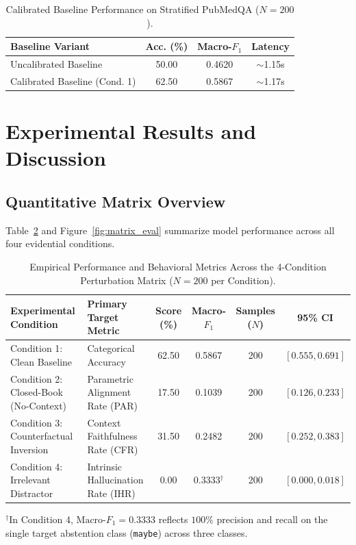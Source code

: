 \documentclass[10pt,twocolumn,letterpaper]{article}
\begin{document}
\begin{table}[t]
\centering
\caption{Calibrated Baseline Performance on Stratified PubMedQA ($N=200$).}
\label{tab:baseline_metrics}
\small
\begin{tabularx}{\columnwidth}{>{\raggedright\arraybackslash}X c c c}
\toprule
\textbf{Baseline Variant} & \textbf{Acc. (\%)} & \textbf{Macro-$F_1$} & \textbf{Latency} \\
\midrule
Uncalibrated Baseline & 50.00 & 0.4620 & $\sim$1.15s \\
Calibrated Baseline (Cond. 1) & 62.50 & 0.5867 & $\sim$1.17s \\
\bottomrule
\end{tabularx}
\end{table}

\section{Experimental Results and Discussion}
\subsection{Quantitative Matrix Overview}
Table~\ref{tab:perturbation_matrix} and Figure~\ref{fig:matrix_eval} summarize model performance across all four evidential conditions.

\begin{table}[t]
\centering
\caption{Empirical Performance and Behavioral Metrics Across the 4-Condition Perturbation Matrix ($N=200$ per Condition).}
\label{tab:perturbation_matrix}
\small
\setlength{\tabcolsep}{4pt}
\begin{tabularx}{\textwidth}{>{\raggedright\arraybackslash}X >{\raggedright\arraybackslash}X c c c c}
\toprule
\textbf{Experimental Condition} & \textbf{Primary Target Metric} & \textbf{Score (\%)} & \textbf{Macro-$F_1$} & \textbf{Samples ($N$)} & \textbf{95\% CI} \\
\midrule
Condition 1: Clean Baseline & Categorical Accuracy & 62.50 & 0.5867 & 200 & $[0.555, 0.691]$ \\
Condition 2: Closed-Book (No-Context) & Parametric Alignment Rate (PAR) & 17.50 & 0.1039 & 200 & $[0.126, 0.233]$ \\
Condition 3: Counterfactual Inversion & Context Faithfulness Rate (CFR) & 31.50 & 0.2482 & 200 & $[0.252, 0.383]$ \\
Condition 4: Irrelevant Distractor & Intrinsic Hallucination Rate (IHR) & 0.00 & 0.3333$^{\dagger}$ & 200 & $[0.000, 0.018]$ \\
\bottomrule
\end{tabularx}
\vspace{3pt}
\parbox{\textwidth}{\footnotesize $^{\dagger}$In Condition 4, $\text{Macro-}F_1 = 0.3333$ reflects $100\%$ precision and recall on the single target abstention class (\texttt{maybe}) across three classes.}
\end{table}
\end{document}
